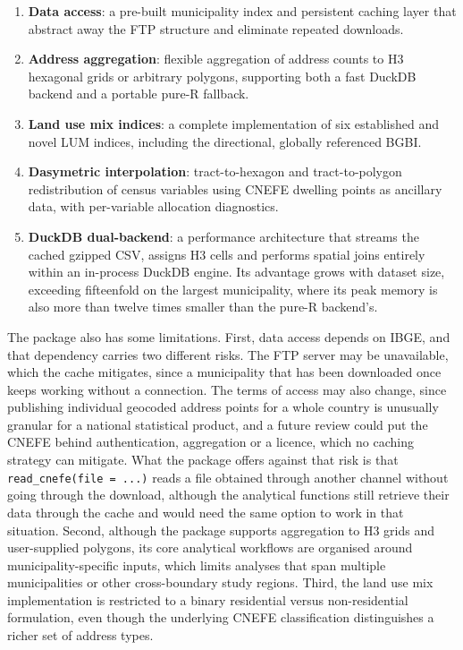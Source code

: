 \begin{enumerate}
\def\labelenumi{\arabic{enumi}.}
\tightlist
\item
  \textbf{Data access}: a pre-built municipality index and persistent
  caching layer that abstract away the FTP structure and eliminate
  repeated downloads.
\item
  \textbf{Address aggregation}: flexible aggregation of address counts to
  H3 hexagonal grids or arbitrary polygons, supporting both a fast
  DuckDB backend and a portable pure-R fallback.
\item
  \textbf{Land use mix indices}: a complete implementation of six
  established and novel LUM indices, including the directional,
  globally referenced BGBI.
\item
  \textbf{Dasymetric interpolation}: tract-to-hexagon and tract-to-polygon
  redistribution of census variables using CNEFE dwelling points as
  ancillary data, with per-variable allocation diagnostics.
\item
  \textbf{DuckDB dual-backend}: a performance architecture that streams the
  cached gzipped CSV, assigns H3 cells and performs spatial joins
  entirely within an in-process DuckDB engine. Its advantage grows
  with dataset size, exceeding fifteenfold on the largest
  municipality, where its peak memory is also more than twelve times
  smaller than the pure-R backend's.
\end{enumerate}

The package also has some limitations. First, data access depends on
IBGE, and that dependency carries two different risks. The FTP server
may be unavailable, which the cache mitigates, since a municipality that
has been downloaded once keeps working without a connection. The terms
of access may also change, since publishing individual geocoded address
points for a whole country is unusually granular for a national
statistical product, and a future review could put the CNEFE behind authentication,
aggregation or a licence, which no caching strategy can mitigate. What
the package offers against that risk is that \texttt{read\_cnefe(file\ =\ ...)}
reads a file obtained through another channel without going through the
download, although the analytical functions still retrieve their data
through the cache and would need the same option to work in that
situation. Second, although the package supports aggregation to H3 grids
and user-supplied polygons, its core analytical workflows are organised
around municipality-specific inputs, which limits analyses that span
multiple municipalities or other cross-boundary study regions. Third,
the land use mix implementation is restricted to a binary residential
versus non-residential formulation, even though the underlying CNEFE
classification distinguishes a richer set of address types.

